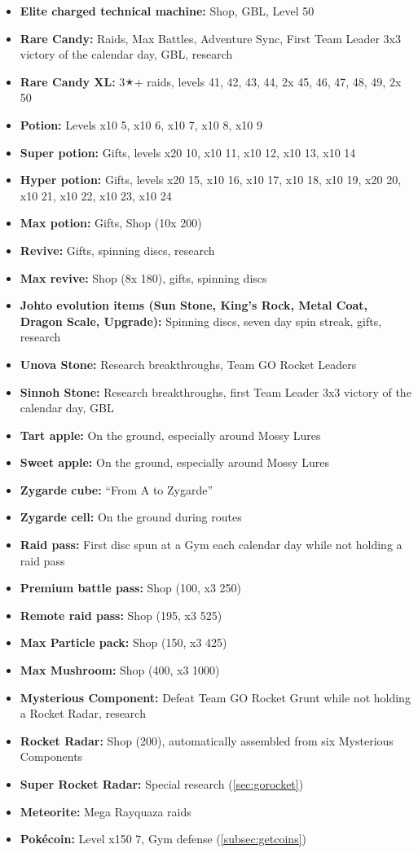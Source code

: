 \begin{itemize}[noitemsep]
\item \textbf{Elite charged technical machine:} Shop, GBL, Level 50
\item \textbf{Rare Candy:} Raids, Max Battles, Adventure Sync, First Team Leader 3x3 victory of the calendar day, GBL, research
\item \textbf{Rare Candy XL:} 3🟉+ raids, levels 41, 42, 43, 44, 2x 45, 46, 47, 48, 49, 2x 50
\item \textbf{Potion:} Levels x10 5, x10 6, x10 7, x10 8, x10 9
\item \textbf{Super potion:} Gifts, levels x20 10, x10 11, x10 12, x10 13, x10 14
\item \textbf{Hyper potion:} Gifts, levels x20 15, x10 16, x10 17, x10 18, x10 19, x20 20, x10 21, x10 22, x10 23, x10 24
\item \textbf{Max potion:} Gifts, Shop (10x 200\coin)
\item \textbf{Revive:} Gifts, spinning discs, research
\item \textbf{Max revive:} Shop (8x 180\coin), gifts, spinning discs
\item \textbf{Johto evolution items (Sun Stone, King's Rock, Metal Coat, Dragon Scale, Upgrade):} Spinning discs, seven day spin streak, gifts, research
\item \textbf{Unova Stone:} Research breakthroughs, Team GO Rocket Leaders
\item \textbf{Sinnoh Stone:} Research breakthroughs, first Team Leader 3x3 victory of the calendar day, GBL
\item \textbf{Tart apple:} On the ground, especially around Mossy Lures
\item \textbf{Sweet apple:} On the ground, especially around Mossy Lures
\item \textbf{Zygarde cube:} ``From A to Zygarde''
\item \textbf{Zygarde cell:} On the ground during routes
\item \textbf{Raid pass:} First disc spun at a Gym each calendar day while not holding a raid pass
\item \textbf{Premium battle pass:} Shop (100\coin, x3 250\coin)
\item \textbf{Remote raid pass:} Shop (195\coin, x3 525\coin)
\item \textbf{Max Particle pack:} Shop (150\coin, x3 425\coin)
\item \textbf{Max Mushroom:} Shop (400\coin, x3 1000\coin)
\item \textbf{Mysterious Component:} Defeat Team GO Rocket Grunt while not holding a Rocket Radar, research
\item \textbf{Rocket Radar:} Shop (200\coin), automatically assembled from six Mysterious Components
\item \textbf{Super Rocket Radar:} Special research (\autoref{sec:gorocket})
\item \textbf{Meteorite:} Mega Rayquaza raids
\item \textbf{Pokécoin:} Level x150 7, Gym defense (\autoref{subsec:getcoins})
\end{itemize}
